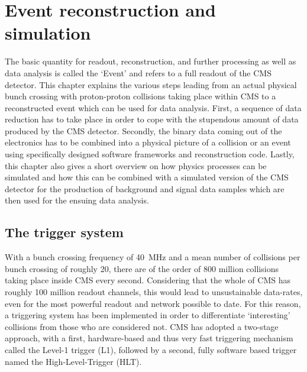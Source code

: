 \chapter{Event reconstruction and simulation}
\label{ch:simreco}
The basic quantity for readout, reconstruction, and further processing as well as data analysis is called the `Event' and refers to a full readout of the
CMS detector. This chapter explains the various steps leading from an actual physical bunch crossing with proton-proton collisions taking place within CMS 
to a reconstructed event which can be used for data analysis. First, a sequence of data reduction has to take place in order to cope with the stupendous amount
of data produced by the CMS detector. Secondly, the binary data coming out of the electronics has to be combined into a physical picture of a collision or an event
using specifically designed software frameworks and reconstruction code. Lastly, this chapter also gives a short overview on how physics processes can be simulated
and how this can be combined with a simulated version of the CMS detector for the production of background and signal data samples which are then used for
the ensuing data analysis.


\section{The trigger system}
\label{sub:cms_trigger}
With a bunch crossing frequency of \SI{40}{\mega\hertz} and a mean number of collisions per bunch crossing of roughly 20, there are of the order of 800 million collisions taking
place inside CMS every second. Considering that the whole of CMS has roughly 100 million readout channels, this would lead to unsustainable data-rates, even for the most 
powerful readout and network possible to date. For this reason, a triggering system has been implemented in order to differentiate `interesting' collisions from those
who are considered not. CMS has adopted a two-stage approach, with a first, hardware-based and thus very fast triggering mechanism called the Level-1 trigger (L1), followed
by a second, fully software based trigger named the High-Level-Trigger (HLT). 

